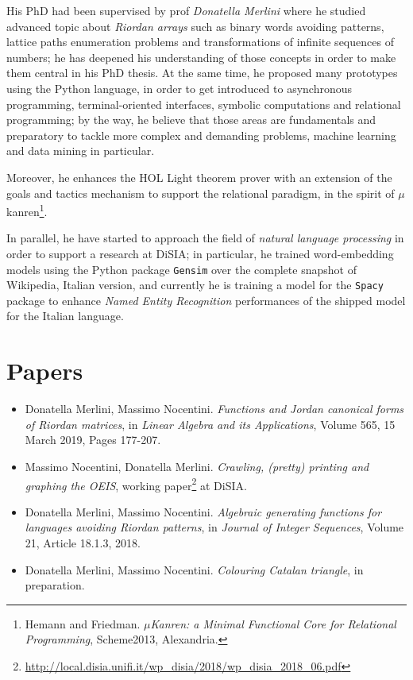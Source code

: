 \documentclass[a4paper]{article} %
\begin{document}
    His PhD had been supervised by prof \textit{Donatella Merlini} where he
    studied advanced topic about \textit{Riordan arrays} such as binary words
    avoiding patterns, lattice paths enumeration problems and transformations
    of infinite sequences of numbers; he has deepened his understanding of
    those concepts in order to make them central in his PhD thesis. At the same
    time, he proposed many prototypes using the Python language, in order to
    get introduced to asynchronous programming, terminal-oriented interfaces,
    symbolic computations and relational programming; by the way, he believe
    that those areas are fundamentals and preparatory to tackle more complex
    and demanding problems, machine learning and data mining in particular.

    Moreover, he enhances the HOL
    Light theorem prover with an extension of the goals and tactics mechanism
    to support the relational paradigm, in the spirit of
    $\mu$kanren\footnote{Hemann and Friedman. \textit{$\mu$Kanren: a Minimal Functional
    Core for Relational Programming}, Scheme2013, Alexandria.}.
	
	In parallel, he have started to approach the field of \emph{natural language processing}
	in order to support a research at DiSIA; in particular, he trained word-embedding models
	using the Python package \texttt{Gensim} over the complete snapshot of Wikipedia, Italian
	version, and currently he is training a model for the \texttt{Spacy} package to
	enhance \emph{Named Entity Recognition} performances of the shipped model for the
	Italian language.

    \section{Papers}

    \begin{itemize}

        \item Donatella Merlini, Massimo Nocentini. \emph{Functions and Jordan canonical forms of Riordan matrices},
        in \textit{Linear Algebra and its Applications}, Volume 565, 15 March 2019, Pages 177-207.

        \item Massimo Nocentini, Donatella Merlini. \emph{Crawling, (pretty) printing and graphing the OEIS}, 
        working paper\footnote{\url{http://local.disia.unifi.it/wp_disia/2018/wp_disia_2018_06.pdf}} at DiSIA.

        \item Donatella Merlini, Massimo Nocentini. \emph{Algebraic generating functions for languages
            avoiding Riordan patterns}, in \textit{Journal of Integer Sequences}, Volume 21, Article 18.1.3, 2018.

        \item Donatella Merlini, Massimo Nocentini. \emph{Colouring Catalan triangle}, in preparation.

    \end{itemize}
    
\end{document}
